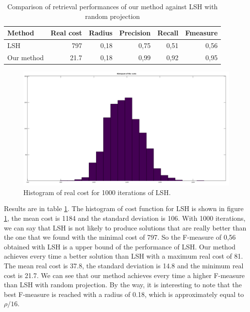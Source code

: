 \begin{table}
	\centering
	\caption{Comparison of retrieval performances of our method against LSH with random projection}
	\label{table:lsh_vs_hyper}
	\begin{tabular}{|lrrrrr|}
	\hline
	Method     & Real cost & Radius & Precision & Recall & Fmeasure \\
	\hline                          
	LSH        &       797 &  0,18 &      0,75 &   0,51 &     0,56 \\
	Our method &      21.7 &  0,18 &      0,99 &   0,92 &     0,95 \\
	\hline
	\end{tabular}
\end{table}

\begin{figure}
	\centering
	
	\includegraphics[width=\textwidth]{img/lsh_best_of_1000.png}
	\caption{Histogram of real cost for 1000 iterations of LSH.}
	\label{fig:lsh_vs_hyper_best_of_1000}
\end{figure}

Results are in table \ref{table:lsh_vs_hyper}. The histogram of cost function for LSH is shown in figure \ref{fig:lsh_vs_hyper_best_of_1000}, the mean cost is 1184 and the standard deviation is 106. With 1000 iterations, we can say that LSH is not likely to produce solutions that are really better than the one that we found with the minimal cost of 797. So the F-measure of 0,56 obtained with LSH is a upper bound of the performance of LSH. Our method achieves every time a better solution than LSH with a maximum real cost of 81. The mean real cost is 37.8, the standard deviation is 14.8 and the minimum real cost is 21.7. We can see that our method achieves every time a higher F-measure than LSH with random projection. By the way, it is interesting to note that the best F-measure is reached with a radius of 0.18, which is approximately equal to $\rho / 16$.

